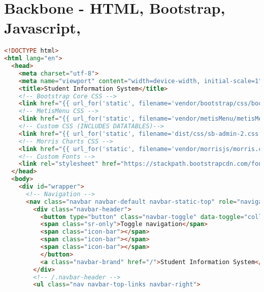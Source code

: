 \section{Backbone - HTML, Bootstrap, Javascript,}
\begin{lstlisting}[language=HTML]
<!DOCTYPE html>
<html lang="en">
  <head>
    <meta charset="utf-8">
    <meta name="viewport" content="width=device-width, initial-scale=1">
    <title>Student Information System</title>
    <!-- Bootstrap Core CSS -->
    <link href="{{ url_for('static', filename='vendor/bootstrap/css/bootstrap.min.css') }}" rel="stylesheet">
    <!-- MetisMenu CSS -->
    <link href="{{ url_for('static', filename='vendor/metisMenu/metisMenu.min.css') }}" rel="stylesheet">
    <!-- Custom CSS (INCLUDES DATATABLES)-->
    <link href="{{ url_for('static', filename='dist/css/sb-admin-2.css') }}" rel="stylesheet">
    <!-- Morris Charts CSS -->
    <link href="{{ url_for('static', filename='vendor/morrisjs/morris.css') }}" rel="stylesheet">
    <!-- Custom Fonts -->
    <link rel="stylesheet" href="https://stackpath.bootstrapcdn.com/font-awesome/4.7.0/css/font-awesome.min.css">
  </head>
  <body>
    <div id="wrapper">
      <!-- Navigation -->
      <nav class="navbar navbar-default navbar-static-top" role="navigation" style="margin-bottom: 0">
        <div class="navbar-header">
          <button type="button" class="navbar-toggle" data-toggle="collapse" data-target=".navbar-collapse">
          <span class="sr-only">Toggle navigation</span>
          <span class="icon-bar"></span>
          <span class="icon-bar"></span>
          <span class="icon-bar"></span>
          </button>
          <a class="navbar-brand" href="/">Student Information System</a>
        </div>
        <!-- /.navbar-header -->
        <ul class="nav navbar-top-links navbar-right">
          

\end{lstlisting}
